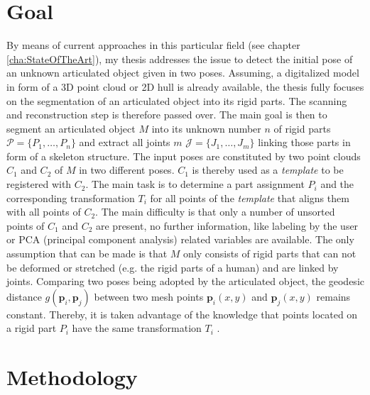 \section{Goal}

By means of current approaches in this particular field (see chapter \ref{cha:StateOfTheArt}), my thesis addresses the issue to detect the initial pose of an unknown articulated object given in two poses. Assuming, a digitalized model in form of a 3D point cloud or 2D hull is already available, the thesis fully focuses on the segmentation of an articulated object into its rigid parts. The scanning and reconstruction step is therefore passed over. The main goal is then to segment an articulated object $M$ into its unknown number $n$ of rigid parts $\mathcal{P} =  \{P_1,\ldots,P_n\}$ and extract all joints $m$ $\mathcal{J} =  \{J_1,\ldots,J_m\}$ linking those parts in form of a skeleton structure. The input poses are constituted by two point clouds $C_1$ and $C_2$ of $M$ in two different poses. $C_1$ is thereby used as a \textit{template} to be registered with $C_2$. The main task is to determine a part assignment $P_i$ and the corresponding transformation $T_i$ for all points of the \textit{template} that aligns them with all points of $C_2$. The main difficulty is that only a number of unsorted points of $C_1$ and $C_2$ are present, no further information, like labeling by the user or PCA (principal component analysis) related variables are available. The only assumption that can be made is that $M$ only consists of rigid parts that can not be deformed or stretched (e.g. the rigid parts of a human) and are linked by joints. Comparing two poses being adopted by the articulated object, the geodesic distance $g(\boldsymbol{p}_i,\boldsymbol{p}_j)$ between two mesh points $\boldsymbol{p}_i(x,y)$ and $\boldsymbol{p}_j(x,y)$ remains constant. Thereby, it is taken advantage of the knowledge that points located on a rigid part $P_i$ have the same transformation $T_i$ .

\section{Methodology}

